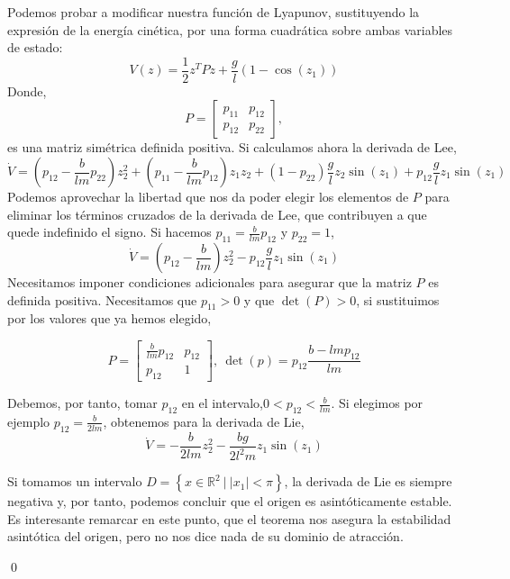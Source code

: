 \begin{example}
Podemos probar a modificar nuestra función de Lyapunov, sustituyendo la expresión de la energía cinética, por una forma cuadrática sobre ambas variables de estado:
\begin{equation*}
V(z) = \frac{1}{2} z^TPz+ \frac{g}{l}\left(1-\cos(z_1)\right)
\end{equation*}
Donde,
\begin{equation*}
P = \begin{bmatrix}
p_{11} & p_{12}\\ p_{12} & p_{22}
\end{bmatrix},
\end{equation*}
es una matriz simétrica definida positiva.
Si calculamos ahora la derivada de Lee,
\begin{equation*}
\dot V =\left(p_{12}-\frac{b}{lm}p_{22}\right)z_2^2+ \left(p_{11}-\frac{b}{lm}p_{12} \right) z_1z_2 + (1 -p_{22})\frac{g}{l} z_2\sin(z_1) + p_{12}\frac{g}{l} z_1\sin(z_1)
\end{equation*}
Podemos aprovechar la libertad que nos da poder elegir los elementos de $P$ para eliminar los términos cruzados de la derivada de Lee, que contribuyen a que quede indefinido el signo. Si hacemos $p_{11} = \frac{b}{lm}p_{12}$ y $p_{22}=1$,
\begin{equation*}
\dot V =\left(p_{12}-\frac{b}{lm}\right)z_2^2-p_{12}\frac{g}{l} z_1\sin(z_1)
\end{equation*}
Necesitamos imponer condiciones adicionales  para asegurar que la matriz $P$ es definida positiva. Necesitamos que $p_{11}>0$ y que $\det(P)>0$, si sustituimos por los valores que ya hemos elegido,

\begin{equation*}
P =\begin{bmatrix}
\frac{b}{lm}p_{12} & p_{12}\\
p_{12} & 1
\end{bmatrix}, \ \det(p) = p_{12}\frac{b-lmp_{12}}{lm}
\end{equation*}

Debemos, por tanto, tomar $p_{12}$ en el intervalo,$0<p_{12}< \frac{b}{lm}$. Si elegimos por ejemplo $p_{12} =  \frac{b}{2lm}$, obtenemos para la derivada de Lie,
\begin{equation*}
\dot V =-\frac{b}{2lm}z_2^2-\frac{bg}{2l^2m}z_1 \sin(z_1)
\end{equation*}

Si tomamos un intervalo $D=\left\{x \in \mathbb{R}^2 \ | \ |x_1|<\pi \right\}$, la derivada de Lie es siempre negativa y, por tanto, podemos concluir que el origen es asintóticamente estable. Es interesante remarcar en este punto, que el teorema nos asegura la estabilidad asintótica del origen, pero no nos dice nada de su dominio de atracción.

\qed
\end{example}


